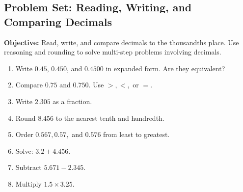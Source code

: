 \documentclass[12pt]{article}
\title{}
\date{}
\begin{document}
\subsection*{Problem Set: Reading, Writing, and Comparing Decimals}
\onehalfspacing

\begin{tcolorbox}[colframe=black!40, colback=gray!5, 
coltitle=black, colbacktitle=black!20, fonttitle=\bfseries\Large, 
title=Learning Objective, halign title=center, left=5pt, right=5pt, top=5pt, bottom=15pt]
\textbf{Objective:} Read, write, and compare decimals to the thousandths place. Use reasoning and rounding to solve multi-step problems involving decimals.
\end{tcolorbox}

\begin{tcolorbox}[colframe=black!60, colback=white, 
coltitle=black, colbacktitle=black!15, fonttitle=\bfseries\Large, 
title=Exercises, halign title=center, left=10pt, right=10pt, top=10pt, bottom=60pt]
\begin{enumerate}[itemsep=3em]
    \item Write \( 0.45 \), \( 0.450 \), and \( 0.4500 \) in expanded form. Are they equivalent?
    \item Compare \( 0.75 \) and \( 0.750 \). Use \( >, <, \) or \( = \).
    \item Write \( 2.305 \) as a fraction.
    \item Round \( 8.456 \) to the nearest tenth and hundredth.
    \item Order \( 0.567, 0.57, \) and \( 0.576 \) from least to greatest.
    \item Solve: \( 3.2 + 4.456 \).
    \item Subtract \( 5.671 - 2.345 \).
    \item Multiply \( 1.5 \times 3.25 \).
    \vspace{1cm}
\end{enumerate}
\end{tcolorbox}

\vspace{1em}
\end{document}
